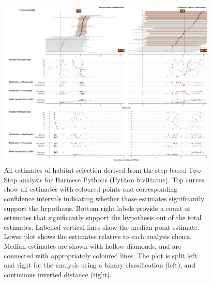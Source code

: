 \documentclass[10pt,a4paper]{article}
\begin{document}
\begin{figure}
\includegraphics[width=1\linewidth]{../../figures/specCurve_Python bivittatus_twoStep} \caption{All estimates of habitat selection derived from the step-based Two-Step analysis for Burmese Pythons (Python bivittatus). Top curves show all estimates with coloured points and corresponding confidence intervals indicating whether those estimates significantly support the hypothesis. Bottom right labels provide a count of estimates that significantly support the hypothesis out of the total estimates. Labelled vertical lines show the median point estimate. Lower plot shows the estimates relative to each analysis choice. Median estimates are shown with hollow diamonds, and are connected with appropriately coloured lines. The plot is split left and right for the analysis using a binary classification (left), and continuous inverted distance (right).}\label{fig:specCurveTwoStepPYBI}
\end{figure}
\end{document}
